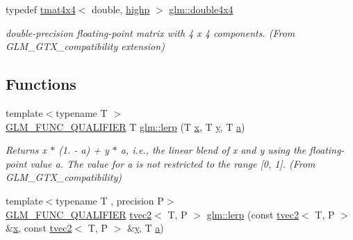 \begin{DoxyCompactItemize}
typedef \mbox{\hyperlink{structglm_1_1tmat4x4}{tmat4x4}}$<$ double, \mbox{\hyperlink{namespaceglm_a0f04f086094c747d227af4425893f545ac6f7eab42eacbb10d59a58e95e362074}{highp}} $>$ \mbox{\hyperlink{group__gtx__compatibility_ga83ac0f28025f5e999b03094400fbddcb}{glm\+::double4x4}}
\begin{DoxyCompactList}\small\item\em double-\/precision floating-\/point matrix with 4 x 4 components. (From G\+L\+M\+\_\+\+G\+T\+X\+\_\+compatibility extension) \end{DoxyCompactList}\end{DoxyCompactItemize}
\subsection*{Functions}
\begin{DoxyCompactItemize}
\item 
{\footnotesize template$<$typename T $>$ }\\\mbox{\hyperlink{setup_8hpp_a33fdea6f91c5f834105f7415e2a64407}{G\+L\+M\+\_\+\+F\+U\+N\+C\+\_\+\+Q\+U\+A\+L\+I\+F\+I\+ER}} T \mbox{\hyperlink{group__gtx__compatibility_ga5494ba3a95ea6594c86fc75236886864}{glm\+::lerp}} (T \mbox{\hyperlink{glad_8h_a92d0386e5c19fb81ea88c9f99644ab1d}{x}}, T \mbox{\hyperlink{glad_8h_a66ddd433d2cacfe27f5906b7e86faeed}{y}}, T \mbox{\hyperlink{glad_8h_ac8729153468b5dcf13f971b21d84d4e5}{a}})
\begin{DoxyCompactList}\small\item\em Returns x $\ast$ (1. -\/ a) + y $\ast$ a, i.\+e., the linear blend of x and y using the floating-\/point value a. The value for a is not restricted to the range \mbox{[}0, 1\mbox{]}. (From G\+L\+M\+\_\+\+G\+T\+X\+\_\+compatibility) \end{DoxyCompactList}\item 
{\footnotesize template$<$typename T , precision P$>$ }\\\mbox{\hyperlink{setup_8hpp_a33fdea6f91c5f834105f7415e2a64407}{G\+L\+M\+\_\+\+F\+U\+N\+C\+\_\+\+Q\+U\+A\+L\+I\+F\+I\+ER}} \mbox{\hyperlink{structglm_1_1tvec2}{tvec2}}$<$ T, P $>$ \mbox{\hyperlink{group__gtx__compatibility_ga0aa79a146332650a1eb18ae996c653fe}{glm\+::lerp}} (const \mbox{\hyperlink{structglm_1_1tvec2}{tvec2}}$<$ T, P $>$ \&\mbox{\hyperlink{glad_8h_a92d0386e5c19fb81ea88c9f99644ab1d}{x}}, const \mbox{\hyperlink{structglm_1_1tvec2}{tvec2}}$<$ T, P $>$ \&\mbox{\hyperlink{glad_8h_a66ddd433d2cacfe27f5906b7e86faeed}{y}}, T \mbox{\hyperlink{glad_8h_ac8729153468b5dcf13f971b21d84d4e5}{a}})

\end{DoxyCompactItemize}
